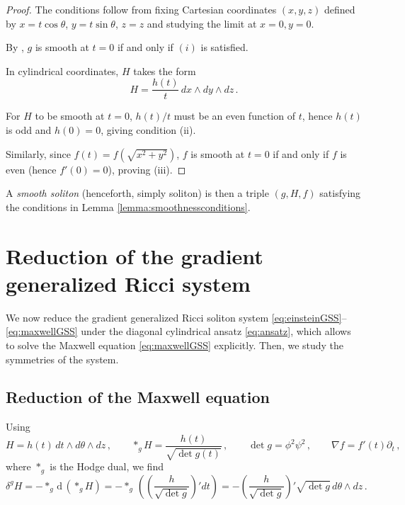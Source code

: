\documentclass[12pt,a4paper,reqno]{amsart}
\theoremstyle{plain}
\theoremstyle{remark}
\numberwithin{equation}{section}
\newcommand{\dd}{\mathrm{d}}
\begin{document}
\begin{proof}
The conditions follow from fixing Cartesian coordinates $(x,y,z)$ defined by $x=t\cos\theta$, $y=t\sin\theta$, $z=z$ and studying the limit at $x=0, y=0$.

By \cite[Proposition 1.4.7]{Petersen2016}, $g$ is smooth at $t=0$ if and only if $(i)$ is satisfied.

In cylindrical coordinates, $H$ takes the form
\begin{equation*}
H = \frac{h(t)}{t}\,dx\wedge dy\wedge dz \,.
\end{equation*} 

For $H$ to be smooth at $t=0$, $h(t)/t$ must be an even function of $t$, hence $h(t)$ is odd and $h(0)=0$, giving condition (ii).

Similarly, since $f(t)=f(\sqrt{x^2+y^2})$, $f$ is smooth at $t=0$ if and only if $f$ is even (hence $f'(0)=0$), proving (iii).
\end{proof}

A \emph{smooth soliton} (henceforth, simply soliton) is then a triple $(g,H,f)$ satisfying the conditions in Lemma \ref{lemma:smoothnessconditions}. 


\section{Reduction of the gradient generalized Ricci system}

We now reduce the gradient generalized Ricci soliton system \eqref{eq:einsteinGSS}--\eqref{eq:maxwellGSS} under the diagonal cylindrical ansatz \eqref{eq:ansatz}, which allows to solve the Maxwell equation \eqref{eq:maxwellGSS} explicitly. Then, we study the symmetries of the system.

\subsection{Reduction of the Maxwell equation}
\label{sec:reductionmaxwell}

Using
\begin{equation*}
H = h(t)\,dt\wedge d\theta\wedge dz \,, \qquad \ast_g H = \frac{h(t)}{\sqrt{\det g(t)}} \,, \qquad \det g = \phi^2\psi^2 \,, \qquad \nabla f = f'(t)\partial_t \,,
\end{equation*}
where $\ast_g$ is the Hodge dual, we find
\begin{equation*}
\delta^g H = -\ast_g \,\dd \,(\ast_g H) 
= -\ast_g \,\left( \left(\frac{h}{\sqrt{\det g}}\right)' dt \right) = -\left(\frac{h}{\sqrt{\det g}}\right)' \sqrt{\det g} \,d\theta\wedge dz \,.
\end{equation*}
\end{document}
